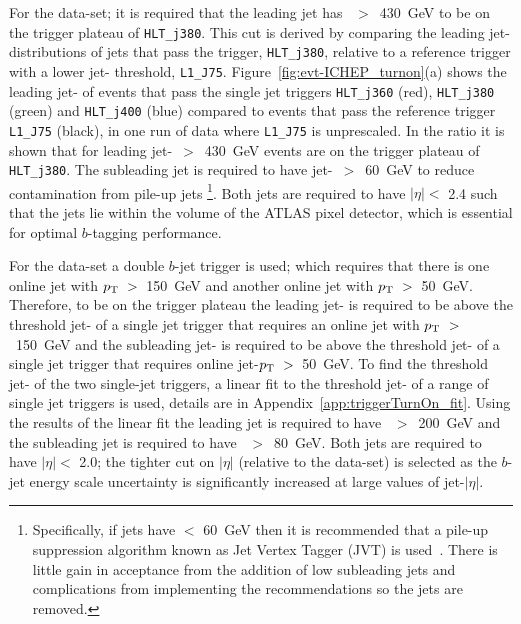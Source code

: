 For the \summer{} data-set; it is required that the leading jet has \pT{}~$>$~430~GeV to be on the trigger plateau of \verb|HLT_j380|.
This cut is derived by comparing the leading jet-\pT{} distributions of jets that pass the trigger, \verb|HLT_j380|,
relative to a reference trigger with a lower jet-\pT{} threshold, \verb|L1_J75|.
Figure~\ref{fig:evt-ICHEP_turnon}(a) shows the leading jet-\pT{}
of events that pass the single jet triggers \verb|HLT_j360| (red), \verb|HLT_j380| (green) and \verb|HLT_j400| (blue)
compared to events that pass the reference trigger \verb|L1_J75| (black),
in one run of data where \verb|L1_J75| is unprescaled.
In the ratio it is shown that for leading jet-\pT{}~$>$~430~GeV events are on the trigger plateau of \verb|HLT_j380|.
The subleading jet is required to have jet-\pT{}~$>$~60~GeV
to reduce contamination from pile-up jets
\footnote{Specifically, if jets have \pT{} $<$ 60~GeV then it is recommended that
  a pile-up suppression algorithm known as Jet Vertex Tagger (JVT) is used~\cite{evt-jvt}.
  There is little gain in acceptance from the addition of low \pT{} subleading jets and
  complications from implementing the recommendations so the jets are removed. }.
Both jets  are required to have $|\eta| <$ 2.4
such that the jets lie within the volume of the ATLAS pixel detector,
which is essential for optimal $b$-tagging performance.



For the \lm{} data-set a double $b$-jet trigger is used;
which requires that there is one online jet with $p_{\mathrm{T}}~>$~150~GeV and another online jet with $p_{\mathrm{T}}~>$~50~GeV.
Therefore, to be on the trigger plateau the leading jet-\pT{} is required to be above the threshold jet-\pT{}
of a single jet trigger that requires an online jet with $p_{\mathrm{T}}~>$~150~GeV
and the subleading jet-\pT{} is required to be above the threshold jet-\pT{}
of a single jet trigger that requires online jet-$p_{\mathrm{T}}~>$~50~GeV.
To find the threshold jet-\pT{} of the two single-jet triggers,
a linear fit to the threshold jet-\pT{} of a range of single jet triggers is used,
details are in Appendix~\ref{app:triggerTurnOn_fit}.
Using the results of the linear fit the leading jet is required to have \pT{}~$>$~200~GeV
and the subleading jet is required to have \pT{}~$>$~80~GeV.
Both jets  are required to have $|\eta| <$ 2.0;
the tighter cut on $|\eta|$ (relative to the \summer{} data-set) is selected as the
$b$-jet energy scale uncertainty is significantly increased at large values of jet-$|\eta|$.

